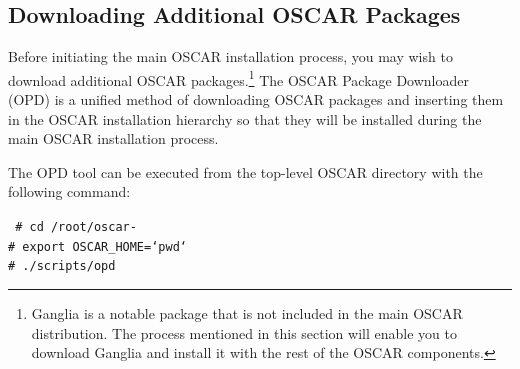 



\subsection{Downloading Additional OSCAR Packages}
\label{det:opd}

\optional

Before initiating the main OSCAR installation process, you may wish to
download additional OSCAR packages.\footnote{Ganglia is a notable
  package that is not included in the main OSCAR distribution.  The
  process mentioned in this section will enable you to download
  Ganglia and install it with the rest of the OSCAR components.}  The
OSCAR Package Downloader (OPD) is a unified method of downloading
OSCAR packages and inserting them in the OSCAR installation hierarchy
so that they will be installed during the main OSCAR installation
process.

The OPD tool can be executed from the top-level OSCAR directory with
the following command:

\vspace{11pt}
{\tt
\# cd /root/oscar-\oscarversion \\
\indent \# export OSCAR\_HOME=`pwd` \\
\indent \# ./scripts/opd
}
\vspace{11pt}

